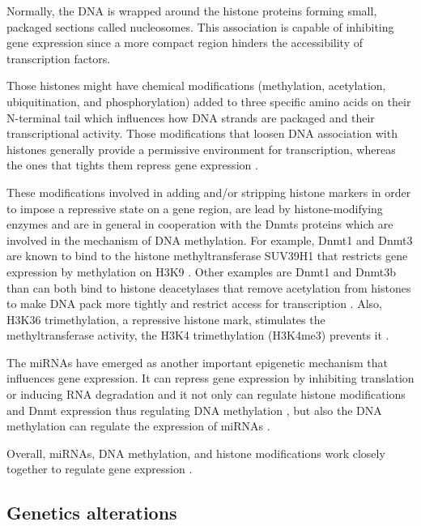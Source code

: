 Normally, the DNA is wrapped around the histone proteins forming small, packaged sections called nucleosomes.
This association is capable of inhibiting gene expression since a more compact region
hinders the accessibility of transcription factors.

Those histones might have chemical modifications (methylation, acetylation, ubiquitination, and phosphorylation) added to three specific amino acids on their N-terminal tail which influences how DNA strands are packaged and their transcriptional activity.
Those modifications that loosen DNA association with histones generally provide a permissive environment for transcription, whereas the ones that tights them repress gene expression \cite{moore2013dna}.

These modifications involved in adding and/or stripping histone markers in order to impose a repressive state on a gene region, are lead by histone-modifying enzymes and are in general in cooperation with the Dnmts proteins
which are involved in the mechanism of DNA methylation.
For example, Dnmt1 and Dnmt3 are known to bind to the histone methyltransferase SUV39H1 that
restricts gene expression by methylation on H3K9 \cite{fuks2003dna}.
Other examples are Dnmt1 and Dnmt3b than can both bind to histone deacetylases that remove
acetylation from histones to make DNA pack more tightly and restrict access for transcription \cite{fuks2000dna,geiman2004dnmt3b}.
Also, H3K36 trimethylation, a repressive histone mark, stimulates the methyltransferase activity, the
H3K4 trimethylation (H3K4me3) prevents it \cite{ooi2007dnmt3l,zhang2010chromatin}.

The miRNAs have emerged as another important epigenetic mechanism that influences gene expression.
It can repress gene expression by inhibiting translation or inducing RNA degradation \cite{berezikov2011evolution} and
 it not only can regulate histone modifications and Dnmt expression thus regulating DNA methylation \cite{benetti2008mammalian,sinkkonen2008micrornas}, but also the DNA methylation can regulate the expression of miRNAs \cite{han2007dna,lujambio2008microrna}.

Overall, miRNAs, DNA methylation, and histone modifications work closely
together to regulate gene expression \cite{moore2013dna}.

\subsection{Genetics alterations}

